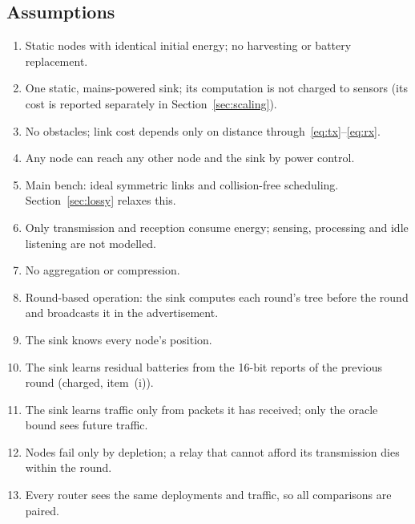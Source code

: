 \subsection{Assumptions}\label{sec:assumptions}
\begin{enumerate}[label=\textbf{A\arabic*}, leftmargin=*]
  \item Static nodes with identical initial energy; no harvesting or battery replacement.
  \item One static, mains-powered sink; its computation is not charged to sensors (its cost is reported separately in Section~\ref{sec:scaling}).
  \item No obstacles; link cost depends only on distance through~\eqref{eq:tx}--\eqref{eq:rx}.
  \item Any node can reach any other node and the sink by power control.
  \item Main bench: ideal symmetric links and collision-free scheduling. Section~\ref{sec:lossy} relaxes this.
  \item Only transmission and reception consume energy; sensing, processing and idle listening are not modelled.
  \item No aggregation or compression.
  \item Round-based operation: the sink computes each round's tree before the round and broadcasts it in the advertisement.
  \item The sink knows every node's position.
  \item The sink learns residual batteries from the 16-bit reports of the previous round (charged, item~(i)).
  \item The sink learns traffic only from packets it has received; only the oracle bound sees future traffic.
  \item Nodes fail only by depletion; a relay that cannot afford its transmission dies within the round.
  \item Every router sees the same deployments and traffic, so all comparisons are paired.
\end{enumerate}

